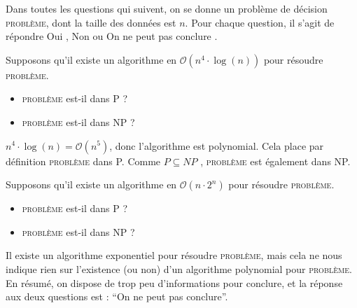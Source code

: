 
\begingroup

\newcommand\PROBLEM{\textsc{problème}}

\begin{exercice}[Appartenance à P/NP]

  Dans toutes les questions qui suivent, on se donne un problème de décision \PROBLEM, dont la taille des données
  est $n$. Pour chaque question, il s'agit de répondre \og Oui \fg, \og Non \fg ou \og On ne peut pas conclure \fg.

  \begin{questions}
  \item Supposons qu'il existe un algorithme en $\mathcal{O}\left(n^4 \cdot \log(n) \right)$ pour résoudre \PROBLEM.
    \begin{itemize}
    \item \PROBLEM{} est-il dans P ?
    \item \PROBLEM{} est-il dans NP ?
    \end{itemize}
  \end{questions}
  \begin{corrections}
    $n^4 \cdot \log(n) = \mathcal{O}\left(n^5\right)$, donc l'algorithme est polynomial. 
    Cela place par définition \PROBLEM{} dans P.
    Comme $P \subseteq NP$ , \PROBLEM{} est également dans NP.
  \end{corrections}

  \begin{questions}
  \item Supposons qu'il existe un algorithme en $\mathcal{O}\left(n \cdot 2^n\right)$ pour résoudre \PROBLEM.
    \begin{itemize}
    \item \PROBLEM{} est-il dans P ?
    \item \PROBLEM{} est-il dans NP ?
    \end{itemize}
  \end{questions}
  \begin{corrections}
    Il existe un algorithme exponentiel pour résoudre \PROBLEM, mais cela ne nous indique rien sur
    l'existence (ou non) d'un algorithme polynomial pour \PROBLEM. En résumé, on dispose de trop peu
    d'informations pour conclure, et la réponse aux deux questions est : ``On ne peut pas conclure''.
  \end{corrections}


\end{exercice}
